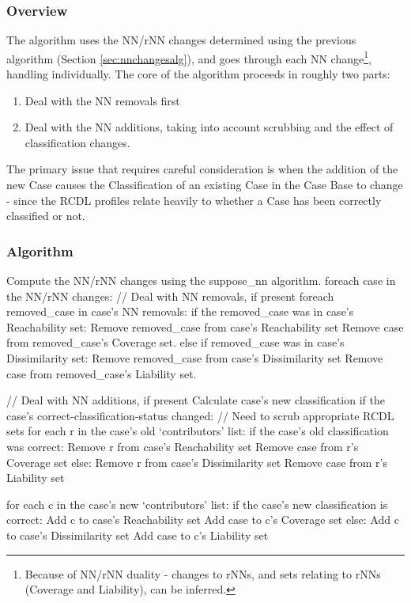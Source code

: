 \documentclass[a4paper,11pt]{report}
\begin{document}
\subsubsection{Overview}
The algorithm uses the NN/rNN changes determined using the previous algorithm (Section \ref{sec:nnchangesalg}), and goes through each NN change\footnote{Because of NN/rNN duality - changes to rNNs, and sets relating to rNNs (Coverage and Liability), can be inferred.}, handling individually. The core of the algorithm proceeds in roughly two parts:
\begin{enumerate}
	\item Deal with the NN removals first
	\item Deal with the NN additions, taking into account scrubbing and the effect of classification changes.
\end{enumerate}

The primary issue that requires careful consideration is when the addition of the new Case causes the Classification of an existing Case in the Case Base to change - since the RCDL profiles relate heavily to whether a Case has been correctly classified or not.

\newpage
\subsubsection{Algorithm} \nopagebreak[4]
\begin{code}
Compute the NN/rNN changes using the suppose_nn algorithm.
foreach case in the NN/rNN changes:
  // Deal with NN removals, if present
  foreach removed_case in case's NN removals:
    if the removed_case was in case's Reachability set:
      Remove removed_case from case's Reachability set
      Remove case from removed_case's Coverage set.
    else if removed_case was in case's Dissimilarity set:
      Remove removed_case from case's Dissimilarity set
      Remove case from removed_case's Liability set.

  // Deal with NN additions, if present  
  Calculate case's new classification
  if the case's correct-classification-status changed:
    // Need to scrub appropriate RCDL sets
    for each r in the case's old `contributors' list:
      if the case's old classification was correct:
        Remove r from case's Reachability set
        Remove case from r's Coverage set
      else:
        Remove r from case's Dissimilarity set
        Remove case from r's Liability set
        
  for each c in the case's new `contributors' list:
    if the case's new classification is correct:
      Add c to case's Reachability set
      Add case to c's Coverage set
    else:
      Add c to case's Dissimilarity set
      Add case to c's Liability set
\end{code}
\end{document}
